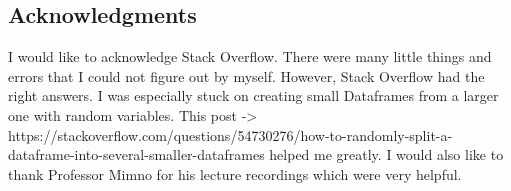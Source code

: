 \documentclass[11pt]{article}
\begin{document}
    \subsection{Acknowledgments}\label{acknowledgments}

I would like to acknowledge Stack Overflow. There were many little
things and errors that I could not figure out by myself. However, Stack
Overflow had the right answers. I was especially stuck on creating small
Dataframes from a larger one with random variables. This post
-\textgreater{}
https://stackoverflow.com/questions/54730276/how-to-randomly-split-a-dataframe-into-several-smaller-dataframes
helped me greatly. I would also like to thank Professor Mimno for his
lecture recordings which were very helpful.


    
    
    
    
\end{document}
